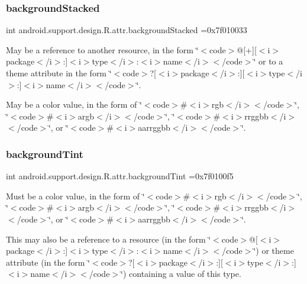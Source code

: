\subsubsection{\texorpdfstring{background\+Stacked}{backgroundStacked}}
{\footnotesize\ttfamily int android.\+support.\+design.\+R.\+attr.\+background\+Stacked =0x7f010033\hspace{0.3cm}{\ttfamily [static]}}

May be a reference to another resource, in the form \char`\"{}$<$code$>$@\mbox{[}+\mbox{]}\mbox{[}$<$i$>$package$<$/i$>$\+:\mbox{]}$<$i$>$type$<$/i$>$\+:$<$i$>$name$<$/i$>$$<$/code$>$\char`\"{} or to a theme attribute in the form \char`\"{}$<$code$>$?\mbox{[}$<$i$>$package$<$/i$>$\+:\mbox{]}\mbox{[}$<$i$>$type$<$/i$>$\+:\mbox{]}$<$i$>$name$<$/i$>$$<$/code$>$\char`\"{}. 

May be a color value, in the form of \char`\"{}$<$code$>$\#$<$i$>$rgb$<$/i$>$$<$/code$>$\char`\"{}, \char`\"{}$<$code$>$\#$<$i$>$argb$<$/i$>$$<$/code$>$\char`\"{}, \char`\"{}$<$code$>$\#$<$i$>$rrggbb$<$/i$>$$<$/code$>$\char`\"{}, or \char`\"{}$<$code$>$\#$<$i$>$aarrggbb$<$/i$>$$<$/code$>$\char`\"{}. \mbox{\label{classandroid_1_1support_1_1design_1_1R_1_1attr_ad5222449c1177317bb4170da3621846d}} 
\subsubsection{\texorpdfstring{background\+Tint}{backgroundTint}}
{\footnotesize\ttfamily int android.\+support.\+design.\+R.\+attr.\+background\+Tint =0x7f0100f5\hspace{0.3cm}{\ttfamily [static]}}

Must be a color value, in the form of \char`\"{}$<$code$>$\#$<$i$>$rgb$<$/i$>$$<$/code$>$\char`\"{}, \char`\"{}$<$code$>$\#$<$i$>$argb$<$/i$>$$<$/code$>$\char`\"{}, \char`\"{}$<$code$>$\#$<$i$>$rrggbb$<$/i$>$$<$/code$>$\char`\"{}, or \char`\"{}$<$code$>$\#$<$i$>$aarrggbb$<$/i$>$$<$/code$>$\char`\"{}. 

This may also be a reference to a resource (in the form \char`\"{}$<$code$>$@\mbox{[}$<$i$>$package$<$/i$>$\+:\mbox{]}$<$i$>$type$<$/i$>$\+:$<$i$>$name$<$/i$>$$<$/code$>$\char`\"{}) or theme attribute (in the form \char`\"{}$<$code$>$?\mbox{[}$<$i$>$package$<$/i$>$\+:\mbox{]}\mbox{[}$<$i$>$type$<$/i$>$\+:\mbox{]}$<$i$>$name$<$/i$>$$<$/code$>$\char`\"{}) containing a value of this type. \mbox{\label{classandroid_1_1support_1_1design_1_1R_1_1attr_a012eb62d26b9f9867a471ece462ff436}} 
